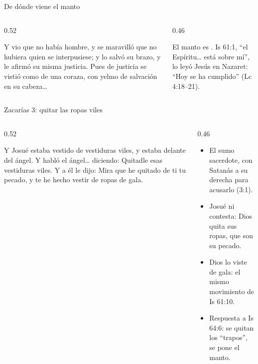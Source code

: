 \begin{frame}{De dónde viene el manto}
\begin{columns}[c,onlytextwidth]
\begin{column}{0.52\textwidth}
\begin{cita}Y vio que no había hombre, y se maravilló que no hubiera quien se interpusiese; y lo salvó su brazo, y le afirmó su misma justicia. Pues de justicia se vistió como de una coraza, con yelmo de salvación en su cabeza\ldots{}\end{cita}
\end{column}
\begin{column}{0.46\textwidth}
\centering
{}\par\medskip
\small El manto es . Is 61:1, ``el Espíritu\ldots{} está sobre mí'', lo leyó Jesús en Nazaret: ``Hoy se ha cumplido'' (Lc 4:18--21).
\end{column}
\end{columns}
\end{frame}

\begin{frame}{Zacarías 3: quitar las ropas viles}
\begin{columns}[c,onlytextwidth]
\begin{column}{0.52\textwidth}
\begin{cita}Y Josué estaba vestido de vestiduras viles, y estaba delante del ángel. Y habló el ángel\ldots{} diciendo: Quitadle esas vestiduras viles. Y a él le dijo: Mira que he quitado de ti tu pecado, y te he hecho vestir de ropas de gala.\end{cita}
\begin{center}\small{}\end{center}
\end{column}
\begin{column}{0.46\textwidth}\small
\begin{itemize}
\item El sumo sacerdote, con Satanás a su derecha para acusarlo (3:1).
\item Josué  ni contesta: Dios quita sus ropas, que son su pecado.
\item Dios lo viste de gala: el mismo movimiento de Is 61:10.
\item Respuesta a Is 64:6: se quitan los ``trapos'', se pone el manto.
\end{itemize}
\end{column}
\end{columns}
\end{frame}

